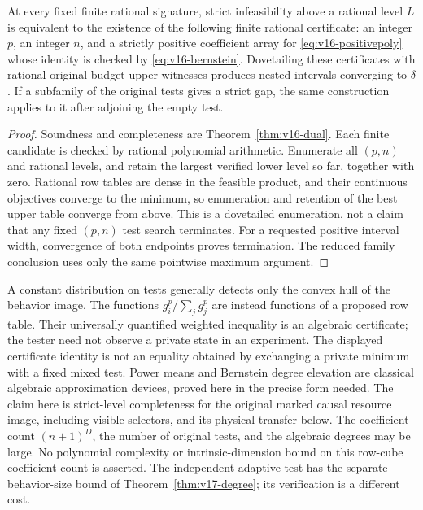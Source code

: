 \begin{corollary}
\label{cor:v16-algorithm}
At every fixed finite rational signature, strict infeasibility above a
rational level $L$ is equivalent to the existence of the following
finite rational certificate: an integer $p$, an integer $n$, and a
strictly positive coefficient array for \eqref{eq:v16-positivepoly}
whose identity is checked by \eqref{eq:v16-bernstein}. Dovetailing these
certificates with rational original-budget upper witnesses produces
nested intervals converging to $\delta$. If a subfamily of the original
tests gives a strict gap, the same construction applies to it after
adjoining the empty test.
\end{corollary}
\begin{proof}
Soundness and completeness are Theorem~\ref{thm:v16-dual}. Each finite
candidate is checked by rational polynomial arithmetic. Enumerate all
$(p,n)$ and rational levels, and retain the largest verified lower
level so far, together with zero. Rational row tables are dense in the
feasible product, and their continuous objectives converge to the
minimum, so enumeration and retention of the best upper table converge
from above. This is a dovetailed enumeration, not a claim that any
fixed $(p,n)$ test search terminates. For a requested positive interval
width, convergence of both endpoints proves termination. The reduced
family conclusion uses only the same pointwise maximum argument.
\end{proof}

\begin{remark}
A constant distribution on tests generally detects only the convex hull
of the behavior image. The functions $g_i^p/\sum_jg_j^p$ are instead
functions of a proposed row table. Their universally quantified weighted
inequality is an algebraic certificate; the tester need not observe a
private state in an experiment. The displayed certificate identity is not an equality
obtained by exchanging a private minimum with a fixed mixed test.
Power means and Bernstein degree elevation are classical algebraic
approximation devices, proved here in the precise form needed. The
claim here is strict-level completeness for the original marked causal
resource image, including visible selectors, and its physical transfer
below. The coefficient count $(n+1)^D$, the number of original tests,
and the algebraic degrees may be large. No polynomial complexity or intrinsic-dimension bound on this
row-cube coefficient count is asserted. The independent adaptive
test has the separate behavior-size bound of
Theorem~\ref{thm:v17-degree}; its verification is a different cost.
\end{remark}

